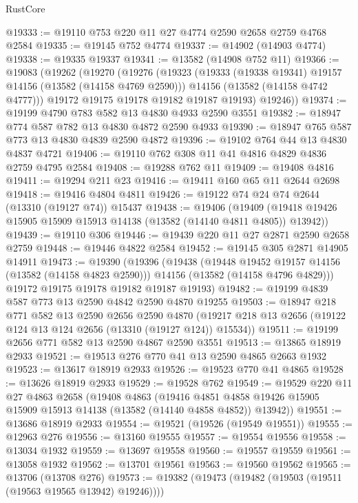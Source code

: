 \begin{lexlean}{RustCore}
\begin{coremodule}
@19333 := @19110 @753 @220 @11 @27 @4774 @2590 @2658 @2759 @4768 @2584
@19335 := @19145 @752 @4774
@19337 := @14902 (@14903 @4774)
@19338 := @19335 @19337
@19341 := @13582 (@14908 @752 @11)
@19366 := @19083
    (@19262
      (@19270
        (@19276
          (@19323
            (@19333 (@19338 @19341) @19157 @14156 (@13582 (@14158 @4769 @2590)))
            @14156
            (@13582 (@14158 @4742 @4777)))
          @19172
          @19175
          @19178
          @19182
          @19187
          @19193)
        @19246))
@19374 := @19199 @4790 @783 @582 @13 @4830 @4933 @2590 @3551
@19382 := @18947 @774 @587 @782 @13 @4830 @4872 @2590 @4933
@19390 := @18947 @765 @587 @773 @13 @4830 @4839 @2590 @4872
@19396 := @19102 @764 @44 @13 @4830 @4837 @4721
@19406 := @19110 @762 @308 @11 @41 @4816 @4829 @4836 @2759 @4795 @2584
@19408 := @19288 @762 @11
@19409 := @19408 @4816
@19411 := @19294 @211 @23
@19416 := @19411 @160 @65 @11 @2644 @2698
@19418 := @19416 @4804 @4811
@19426 := @19122 @74 @24 @74 @2644 (@13310 (@19127 @74)) @15437
@19438 := @19406
    (@19409 (@19418 @19426 @15905 @15909 @15913 @14138 (@13582 (@14140 @4811 @4805)) @13942))
@19439 := @19110 @306
@19446 := @19439 @220 @11 @27 @2871 @2590 @2658 @2759
@19448 := @19446 @4822 @2584
@19452 := @19145 @305 @2871 @14905 @14911
@19473 := @19390
    (@19396
      (@19438
        (@19448 @19452 @19157 @14156 (@13582 (@14158 @4823 @2590)))
        @14156
        (@13582 (@14158 @4796 @4829)))
      @19172
      @19175
      @19178
      @19182
      @19187
      @19193)
@19482 := @19199 @4839 @587 @773 @13 @2590 @4842 @2590 @4870 @19255
@19503 := @18947
    @218
    @771
    @582
    @13
    @2590
    @2656
    @2590
    @4870
    (@19217 @218 @13 @2656 (@19122 @124 @13 @124 @2656 (@13310 (@19127 @124)) @15534))
@19511 := @19199 @2656 @771 @582 @13 @2590 @4867 @2590 @3551
@19513 := @13865 @18919 @2933
@19521 := @19513 @276 @770 @41 @13 @2590 @4865 @2663 @1932
@19523 := @13617 @18919 @2933
@19526 := @19523 @770 @41 @4865
@19528 := @13626 @18919 @2933
@19529 := @19528 @762
@19549 := @19529
    @220
    @11
    @27
    @4863
    @2658
    (@19408
      @4863
      (@19416 @4851 @4858 @19426 @15905 @15909 @15913 @14138 (@13582 (@14140 @4858 @4852)) @13942))
@19551 := @13686 @18919 @2933
@19554 := @19521 (@19526 (@19549 @19551))
@19555 := @12963 @276
@19556 := @13160 @19555
@19557 := @19554 @19556
@19558 := @13034 @1932
@19559 := @13697 @19558
@19560 := @19557 @19559
@19561 := @13058 @1932
@19562 := @13701 @19561
@19563 := @19560 @19562
@19565 := @13706 (@13708 @276)
@19573 := @19382 (@19473 (@19482 (@19503 (@19511 (@19563 @19565 @13942) @19246))))

\end{coremodule}
\end{lexlean}
